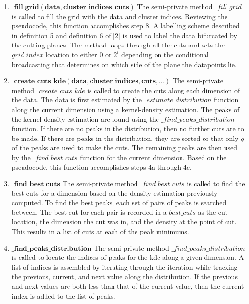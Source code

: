 \begin{enumerate}
    \item $\mathbf{\_fill\_grid(data, cluster\_indices,cuts)}$\newline
    {The semi-private method $\_fill\_grid$ is called to fill the grid with the data and cluster indices. Reviewing the pseudocode, this function accomplishes step 8. 
    A labelling scheme described in definition 5 and definition 6 of [2] is used to label the data bifurcated by the cutting planes. 
    The method loops through all the cuts and sets the $grid\_index$ location to either 0 or ${2^i}$ depending on the conditional broadcasting that determines on which side of the plane the datapoints lie.}
    \item $\mathbf{\_create\_cuts\_kde(data, cluster\_indices,cuts,  ... )}$\newline
    {The semi-private method $\_create\_cuts\_kde$ is called to create the cuts along each dimension of the data.
    The data is first estimated by the $\_estimate\_distribution$ function along the current dimension using a kernel-density estimation.
    The peaks of the kernel-density estimation are found using the $\_find\_peaks\_distribution$ function.
    If there are no peaks in the distribution, then no further cuts are to be made.
    If there are peaks in the distribution, they are sorted so that only $q$ of the peaks are used to make the cuts.
    The remaining peaks are then used by the $\_find\_best\_cuts$ function for the current dimension.
    Based on the pseudocode, this function accomplishes steps 4a through 4c. }
    \item $\mathbf{\_find\_best\_cuts}$\newline
    {The semi-private method $\_find\_best\_cuts$ is called to find the best cuts for a dimension based on the density estimation previously computed.
    To find the best peaks, each set of pairs of peaks is searched between. The best cut for each pair is recorded in a $best\_cuts$ as the cut location, the dimension the cut was in, and the density at the point of cut.
    This results in a list of cuts at each of the peak minimums.}
    \item $\mathbf{\_find\_peaks\_distribution}$\newline
    {The semi-private method $\_find\_peaks\_distribution$ is called to locate the indices of peaks for the kde along a given dimension.
    A list of indices is assembled by iterating through the iteration while tracking the previous, current, and next value along the distribution.
    If the previous and next values are both less than that of the current value, then the current index is added to the list of peaks.}

\end{enumerate}
